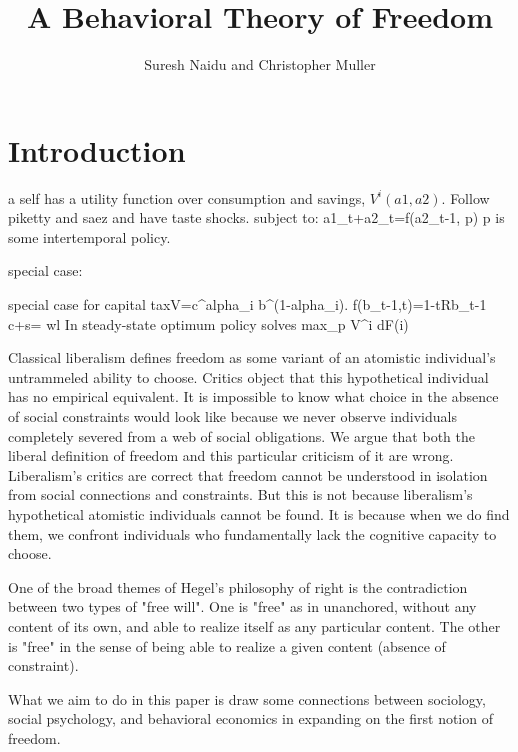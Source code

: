 \documentclass[10pt,a4paper]{article}
\title{A Behavioral Theory of Freedom}
\author{Suresh Naidu and Christopher Muller}
\begin{document}
\maketitle

\begin{abstract}
\end{abstract}

\setcounter{page}{0}
\thispagestyle{empty}

\renewcommand{\baselinestretch}{1.4}\large\normalsize

\section*{Introduction}

a self has a utility function over consumption and savings, $V^i(a1,a2)$. Follow piketty and saez and have taste shocks.
subject to: a1_t+a2_t=f(a2_t-1, p)
p is some intertemporal policy.

special case: 

special case for capital taxV=c^alpha_i b^(1-alpha_i). f(b_t-1,t)=1-tRb_{t-1}
c+s= wl 
In steady-state optimum policy solves max_p \int V^i dF(i)

\noindent Classical liberalism defines freedom as some variant of an atomistic individual's untrammeled ability to choose. Critics object that this hypothetical individual has no empirical equivalent. It is impossible to know what choice in the absence of social constraints would look like because we never observe individuals completely severed from a web of social obligations. We argue that both the liberal definition of freedom and this particular criticism of it are wrong. Liberalism's critics are correct that freedom cannot be understood in isolation from social connections and constraints. But this is not because liberalism's hypothetical atomistic individuals cannot be found. It is because when we do find them, we confront individuals who fundamentally lack the cognitive capacity to choose. 

One of the broad themes of Hegel's philosophy of right is the contradiction between two types of "free will".
One is "free" as in unanchored, without any content of its own, and able to realize itself as any particular content.
The other is "free" in the sense of being able to realize a given content (absence of constraint).

What we aim to do in this paper is draw some connections between sociology, social psychology, and behavioral economics 
in expanding on the first notion of freedom. 
\end{document}
